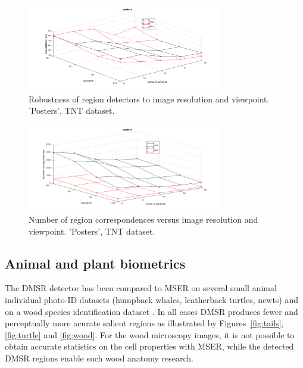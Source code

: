 \documentclass[conference,compsoc]{IEEEtran}
\begin{document}
\begin{figure}[htb]

\begin{minipage}[b]{.9\linewidth}
  \centering
  \centerline{\includegraphics[width=8.5cm]{posters_rep}}
\end{minipage}
\hfill
\caption{Robustness of region detectors to image resolution and viewpoint. 'Posters', TNT dataset.}
\label{fig:tnt}
\vspace{-0.25cm}
\end{figure}
\begin{figure}[htb]

\begin{minipage}[b]{0.9\linewidth}
  \centering
  \centerline{\includegraphics[width=8.5cm]{posters_numreg}}
\end{minipage}
\caption{Number of region correspondences versus image resolution and viewpoint. 'Posters', TNT dataset.}
\label{fig:tnt_numreg}
%
\end{figure}


\subsection{Animal and plant biometrics}
\label{ssec:bio}
The DMSR detector has been compared to MSER on several small animal individual photo-ID datasets (humpback whales, leatherback turtles, newts) and on a wood species identification dataset \cite{RangHumpb06, PauwelsZB08, wood}. In all cases DMSR produces fewer and perceptually more acurate salient regions as illustrated by Figures~\ref{fig:tails}, \ref{fig:turtle} and \ref{fig:wood}. For the wood microscopy images, it is not possible to obtain accurate statistics on the cell properties with MSER, while the detected DMSR regions enable such wood anatomy research.
\end{document}
